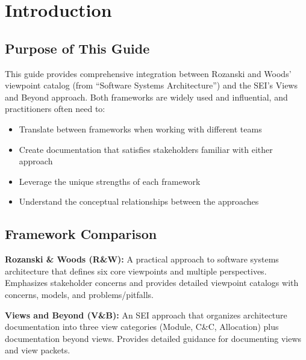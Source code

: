 \documentclass[11pt]{article}
\begin{document}
\newpage
\tableofcontents
\newpage

\section{Introduction}

\subsection{Purpose of This Guide}

This guide provides comprehensive integration between Rozanski and Woods' viewpoint catalog (from ``Software Systems Architecture'') and the SEI's Views and Beyond approach. Both frameworks are widely used and influential, and practitioners often need to:

\begin{itemize}
    \item Translate between frameworks when working with different teams
    \item Create documentation that satisfies stakeholders familiar with either approach
    \item Leverage the unique strengths of each framework
    \item Understand the conceptual relationships between the approaches
\end{itemize}

\subsection{Framework Comparison}

\begin{definition}
\textbf{Rozanski \& Woods (R\&W):} A practical approach to software systems architecture that defines six core viewpoints and multiple perspectives. Emphasizes stakeholder concerns and provides detailed viewpoint catalogs with concerns, models, and problems/pitfalls.
\end{definition}

\begin{definition}
\textbf{Views and Beyond (V\&B):} An SEI approach that organizes architecture documentation into three view categories (Module, C\&C, Allocation) plus documentation beyond views. Provides detailed guidance for documenting views and view packets.
\end{definition}
\end{document}
